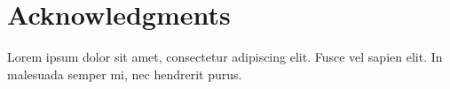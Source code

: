 \section*{Acknowledgments}
Lorem ipsum dolor sit amet, consectetur adipiscing elit. Fusce vel sapien elit. In malesuada semper mi, nec hendrerit purus.
